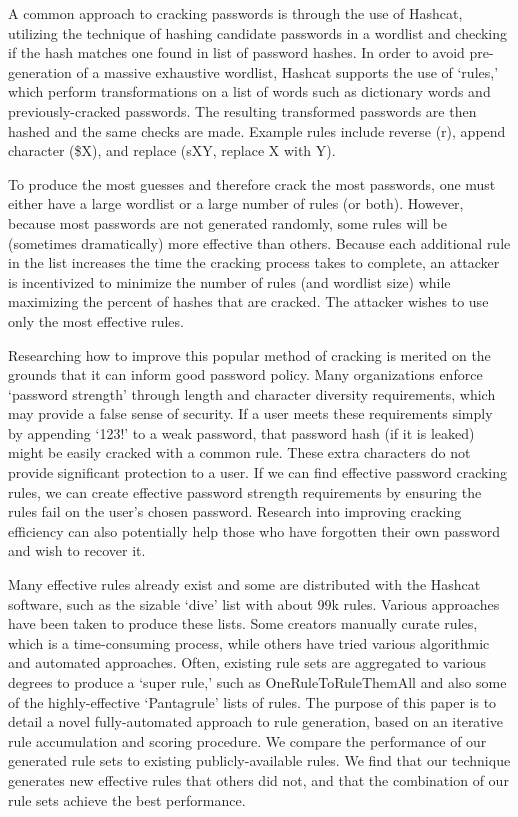 \documentclass{article}
\begin{document}
A common approach to cracking passwords is through the use of
Hashcat\autocite{hashcat}, utilizing the technique of hashing candidate passwords
in a wordlist and checking if the hash matches one found in list of password
hashes. In order to avoid pre-generation of a massive exhaustive wordlist,
Hashcat supports the use of `rules,' which perform transformations on a list of
words such as dictionary words and previously-cracked passwords. The resulting
transformed passwords are then hashed and the same checks are made. Example
rules include reverse (r), append character (\$X), and replace (sXY, replace X
with Y).


To produce the most guesses and therefore crack the most passwords, one must
either have a large wordlist or a large number of rules (or both). However,
because most passwords are not generated randomly, some rules will be
(sometimes dramatically) more effective than others. Because each additional
rule in the list increases the time the cracking process takes to complete, an
attacker is incentivized to minimize the number of rules (and wordlist size)
while maximizing the percent of hashes that are cracked. The attacker wishes to
use only the most effective rules.

Researching how to improve this popular method of cracking
is merited on the grounds that it can inform good password policy.
Many organizations enforce `password strength' through
length and character diversity requirements, which may provide a false sense
of security. If a user meets these requirements simply by appending `123!' to a
weak password, that password hash (if it is leaked) might be easily cracked with
a common rule. These extra characters do not provide significant protection to
a user.
If we can find effective password cracking rules, we can create effective
password
strength requirements by ensuring the rules fail on the user's chosen password.
Research into improving cracking efficiency can also potentially help those
who have forgotten their own password and wish to recover it.


Many effective rules already exist and some are distributed with the Hashcat
software, such as the sizable `dive' list with about 99k rules. Various
approaches have been taken to produce these lists. Some creators manually
curate rules, which is a time-consuming process, while others have tried
various algorithmic and automated approaches. Often, existing rule sets are
aggregated to various degrees to produce a `super rule,' such as
OneRuleToRuleThemAll\autocite{ortrta} and also some of the highly-effective
`Pantagrule' lists of rules\autocite{pantagrule}. The purpose of this paper
is to detail a novel fully-automated approach to rule generation, based on an
iterative rule accumulation and scoring procedure. We compare the performance of
our generated rule sets to existing publicly-available rules. We find that our
technique generates new effective rules that others did not, and that the
combination of our rule sets achieve the best performance.
\end{document}
